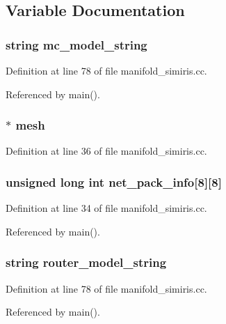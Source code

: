 \subsection{Variable Documentation}
\subsubsection[{mc\_\-model\_\-string}]{\setlength{\rightskip}{0pt plus 5cm}string {\bf mc\_\-model\_\-string}}\label{manifold__simiris_8cc_c1080a1e495d62c01b4d94b6905df2b3}




Definition at line 78 of file manifold\_\-simiris.cc.

Referenced by main().
\subsubsection[{mesh}]{$\ast$ {\bf mesh}}\label{manifold__simiris_8cc_6e08f89b32254fb4b129720418e7c6ea}




Definition at line 36 of file manifold\_\-simiris.cc.
\subsubsection[{net\_\-pack\_\-info}]{\setlength{\rightskip}{0pt plus 5cm}unsigned long int {\bf net\_\-pack\_\-info}[8][8]}\label{manifold__simiris_8cc_c118c8e942c2969e83597b046b9a2dac}




Definition at line 34 of file manifold\_\-simiris.cc.

Referenced by main().
\subsubsection[{router\_\-model\_\-string}]{\setlength{\rightskip}{0pt plus 5cm}string {\bf router\_\-model\_\-string}}\label{manifold__simiris_8cc_4699ae97a212bb3129fffc7a928b9fe5}




Definition at line 78 of file manifold\_\-simiris.cc.

Referenced by main().